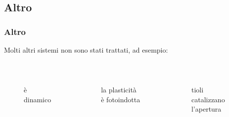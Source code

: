 \subsection{Altro}
\begin{frame}\frametitle{Altro}
\vspace{-5pt}
Molti altri sistemi non sono stati trattati, ad esempio:\vspace{-10pt}
\begin{columns}
\begin{figure}{\\è dinamico}\end{figure}
\vspace{-10pt}\begin{figure}{\\la plasticità è fotoindotta}\end{figure}

\begin{figure}{\\tioli catalizzano l'apertura}\end{figure}


\end{columns}
\end{frame}

